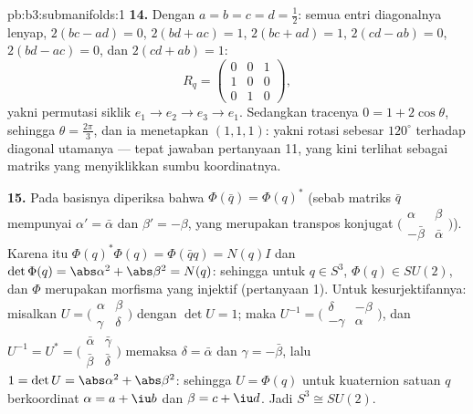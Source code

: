 \begin{solution}{pb:b3:submanifolds:1}
\textbf{14.} Dengan $a = b = c = d = \frac12$: semua entri diagonalnya
lenyap, $2(bc - ad) = 0$, $2(bd + ac) = 1$, $2(bc +
ad) = 1$, $2(cd - ab) = 0$, $2(bd - ac) = 0$, dan $2(cd + ab) =
1$:
\[
R_q = \begin{pmatrix} 0 & 0 & 1\\ 1 & 0 & 0\\ 0 & 1 & 0
\end{pmatrix},
\]
yakni permutasi siklik $e_1 \to e_2 \to e_3 \to e_1$. Sedangkan
tracenya $0 = 1 + 2\cos\theta$, sehingga $\theta = \frac{2\pi}3$,
dan ia menetapkan $(1,1,1)$: yakni rotasi sebesar $120^\circ$ terhadap
diagonal utamanya --- tepat jawaban pertanyaan 11, yang kini
terlihat sebagai matriks yang menyiklikkan sumbu koordinatnya.

\textbf{15.} Pada basisnya diperiksa bahwa $\Phi(\bar q) =
\Phi(q)^*$ (sebab matriks $\bar q$ mempunyai $\alpha' =
\bar\alpha$ dan $\beta' = -\beta$, yang merupakan transpos
konjugat $\bigl(\begin{smallmatrix}\alpha & \beta\\
-\bar\beta & \bar\alpha\end{smallmatrix}\bigr)$). Karena itu
$\Phi(q)^*\Phi(q) = \Phi(\bar qq) = N(q)I$ dan $\det\Phi(q)
= \abs\alpha^2 + \abs\beta^2 = N(q)$: sehingga untuk $q \in S^3$,
$\Phi(q) \in SU(2)$, dan $\Phi$ merupakan morfisma yang injektif
(pertanyaan 1). Untuk kesurjektifannya: misalkan $U =
\bigl(\begin{smallmatrix}\alpha & \beta\\ \gamma &
\delta\end{smallmatrix}\bigr)$ dengan $\det U = 1$; maka
$U^{-1} = \bigl(\begin{smallmatrix}\delta & -\beta\\
-\gamma & \alpha\end{smallmatrix}\bigr)$, dan $U^{-1} = U^*
= \bigl(\begin{smallmatrix}\bar\alpha & \bar\gamma\\
\bar\beta & \bar\delta\end{smallmatrix}\bigr)$ memaksa
$\delta = \bar\alpha$ dan $\gamma = -\bar\beta$, lalu $1 =
\det U = \abs\alpha^2 + \abs\beta^2$: sehingga $U = \Phi(q)$ untuk
kuaternion satuan $q$ berkoordinat $\alpha = a + \iu b$ dan
$\beta = c + \iu d$. Jadi $S^3 \cong SU(2)$.


\end{solution}
